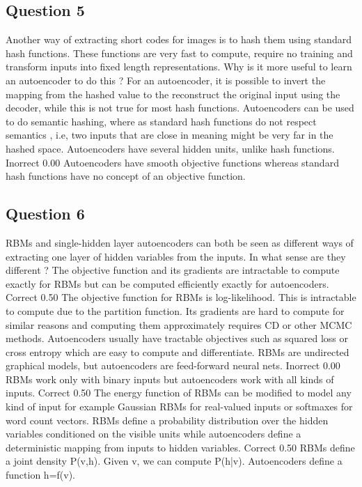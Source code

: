 \newpage \subsection*{Question 5}
Another way of extracting short codes for images is to hash them using standard hash functions. These functions are very fast to compute, require no training and transform inputs into fixed length representations. Why is it more useful to learn an autoencoder to do this ?
For an autoencoder, it is possible to invert the mapping from the hashed value to the reconstruct the original input using the decoder, while this is not true for most hash functions.			
Autoencoders can be used to do semantic hashing, where as standard hash functions do not respect semantics , i.e, two inputs that are close in meaning might be very far in the hashed space.			
Autoencoders have several hidden units, unlike hash functions.	Inorrect	0.00	
Autoencoders have smooth objective functions whereas standard hash functions have no concept of an objective function.			

\newpage \subsection*{Question 6}
RBMs and single-hidden layer autoencoders can both be seen as different ways of extracting one layer of hidden variables from the inputs. In what sense are they different ?
The objective function and its gradients are intractable to compute exactly for RBMs but can be computed efficiently exactly for autoencoders.	Correct	0.50	The objective function for RBMs is log-likelihood. This is intractable to compute due to the partition function. Its gradients are hard to compute for similar reasons and computing them approximately requires CD or other MCMC methods. Autoencoders usually have tractable objectives such as squared loss or cross entropy which are easy to compute and differentiate.
RBMs are undirected graphical models, but autoencoders are feed-forward neural nets.	Inorrect	0.00	
RBMs work only with binary inputs but autoencoders work with all kinds of inputs.	Correct	0.50	The energy function of RBMs can be modified to model any kind of input for example Gaussian RBMs for real-valued inputs or softmaxes for word count vectors.
RBMs define a probability distribution over the hidden variables conditioned on the visible units while autoencoders define a deterministic mapping from inputs to hidden variables.	Correct	0.50	RBMs define a joint density P(v,h). Given v, we can compute P(h|v). Autoencoders define a function h=f(v).


